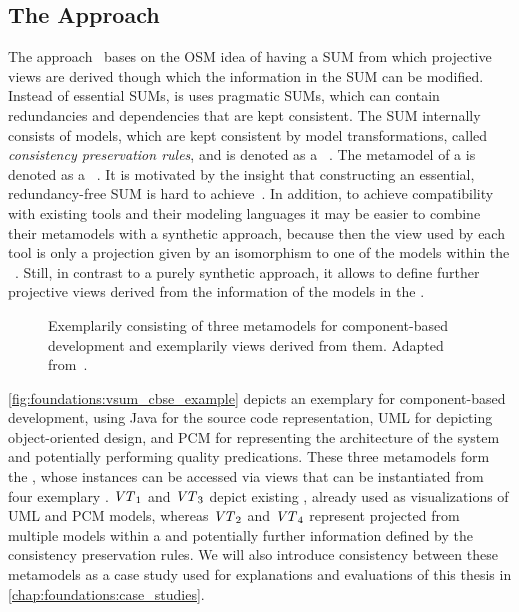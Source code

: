 \subsection{The \vitruv Approach}
\label{chap:foundations:multiview:vitruv}

The \vitruv approach~\cite{klare2020Vitruv-JSS} bases on the \gls{OSM} idea of having a \gls{SUM} from which projective views are derived though which the information in the \gls{SUM} can be modified.
Instead of essential \glspl{SUM}, is uses pragmatic \glspl{SUM}, which can contain redundancies and dependencies that are kept consistent.
The \gls{SUM} internally consists of models, which are kept consistent by model transformations, called \emph{consistency preservation rules}, and is denoted as a \vsum~\cite[Def.~9]{klare2020Vitruv-JSS}.
The metamodel of a \vsum is denoted as a \vsumm~\cite[Def.~10]{klare2020Vitruv-JSS}.
It is motivated by the insight that constructing an essential, redundancy-free \gls{SUM} is hard to achieve~\cite{meier2020ccis}.
In addition, to achieve compatibility with existing tools and their modeling languages it may be easier to combine their metamodels with a synthetic approach, because then the view used by each tool is only a projection given by an isomorphism to one of the models within the \vsum~\cite{klare2020Vitruv-JSS}.
Still, in contrast to a purely synthetic approach, it allows to define further projective views derived from the information of the models in the \vsum.

\begin{figure}
    \centering
    
    \caption[Exemplary \acrshort{VSUMM}]{Exemplarily \vsumm consisting of three metamodels for component-based development and exemplarily views derived from them. Adapted from~\cite[Fig.~4.4]{langhammer2017a}.}
    \label{fig:foundations:vsum_cbse_example}
\end{figure}

\autoref{fig:foundations:vsum_cbse_example} depicts an exemplary \vsumm for component-based development, using Java for the source code representation, \gls{UML} for depicting object-oriented design, and \gls{PCM} for representing the architecture of the system and potentially performing quality predications.
These three metamodels form the \vsumm, whose instances can be accessed via views that can be instantiated from four exemplary \viewtypes.
$\mathit{VT}_1$ and $\mathit{VT}_3$ depict existing \viewtypes, already used as visualizations of \gls{UML} and \gls{PCM} models, whereas $\mathit{VT}_2$ and $\mathit{VT}_4$ represent \viewtypes projected from multiple models within a \vsum and potentially further information defined by the consistency preservation rules.
We will also introduce consistency between these metamodels as a case study used for explanations and evaluations of this thesis in \autoref{chap:foundations:case_studies}.

